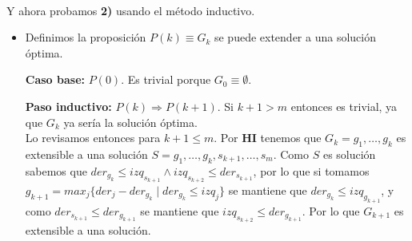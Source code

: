 \documentclass[./main.tex]{subfiles}
\begin{document}
\paragraph{} Y ahora probamos \textbf{2)} usando el método inductivo. \begin{itemize}
  \item Definimos la proposición \(P(k) \equiv G_k\) se puede extender a una solución óptima.
  \item[\textbf{Caso base:}] \(P(0)\). Es trivial porque \(G_0 \equiv \emptyset\).
  \item[\textbf{Paso inductivo:}] \(P(k) \Rightarrow P(k+1)\). Si \(k+1 > m\) entonces es trivial, ya que \(G_k\) ya sería la solución óptima. \\
    Lo revisamos entonces para \(k+1 \leq m\). Por \textbf{HI} tenemos que \(G_k = g_1, \ldots, g_k\) es extensible a una solución \(S = g_1, \ldots, g_k, s_{k+1}, \ldots, s_m\). Como \(S\) es solución sabemos que \(der_{g_k} \leq izq_{s_{k+1}} \land izq_{s_{k+2}} \leq der_{s_{k+1}}\), por lo que si tomamos \(g_{k+1} = max_j\{der_j - der_{g_k} \mid der_{g_k} \leq izq_j\}\) se mantiene que \(der_{g_k} \leq izq_{g_{k+1}}\), y como \(der_{s_{k+1}} \leq der_{g_{k+1}}\) se mantiene que \(izq_{s_{k+2}} \leq der_{g_{k+1}}\). Por lo que \(G_{k+1}\) es extensible a una solución. \done
\end{itemize}
\end{document}
